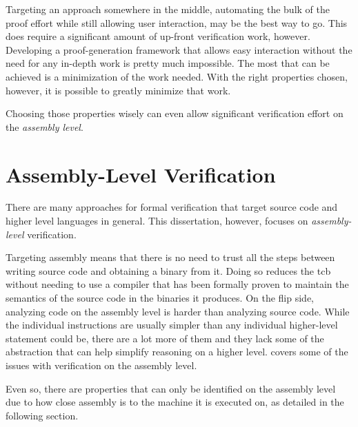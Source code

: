 Targeting an approach somewhere in the middle,
automating the bulk of the proof effort while still allowing user interaction,
may be the best way to go.
This does require a significant amount of up-front verification work, however.
Developing a proof-generation framework that allows easy interaction
without the need for any in-depth work is pretty much impossible.
The most that can be achieved is a minimization of the work needed.
With the right properties chosen, however, it is possible to greatly minimize that work.

Choosing those properties wisely can even allow significant verification effort
on the \emph{assembly level}.

\section{Assembly-Level Verification}
There are many approaches for formal verification that target source code
and higher level languages in general.
This dissertation, however, focuses on \emph{assembly-level} verification.

Targeting assembly means that there is no need to trust all the steps between
writing source code and obtaining a binary from it.
Doing so reduces the \ac{tcb} without needing to use a compiler
that has been formally proven to maintain the semantics of the source code
in the binaries it produces. On the flip side, analyzing code on the assembly level
is harder than analyzing source code.
While the individual instructions are usually simpler
than any individual higher-level statement could be,
there are a lot more of them and they lack some of the abstraction
that can help simplify reasoning on a higher level. 
covers some of the issues with verification on the assembly level.

Even so, there are properties that can only be identified on the assembly level
due to how close assembly is to the machine it is executed on,
as detailed in the following section.

